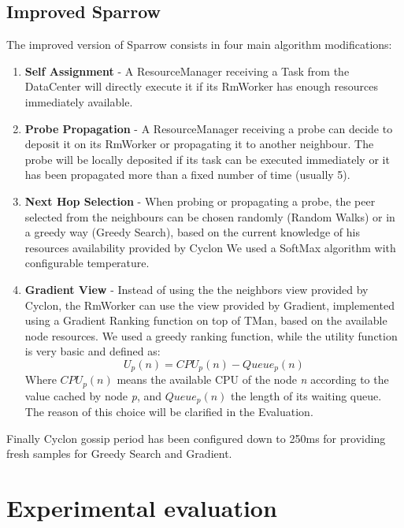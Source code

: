 \documentclass[conference]{IEEEtran}
\begin{document}
  \subsection{Improved Sparrow}
  The improved version of Sparrow consists in four main algorithm modifications:
   \begin{enumerate}

  \item \textbf{Self Assignment }- A ResourceManager receiving a Task from the DataCenter will directly execute it if its RmWorker has enough resources immediately available.
  
  \item \textbf{Probe Propagation} - A ResourceManager receiving a probe can decide to deposit it on its RmWorker or propagating it to another neighbour.  The probe will be locally deposited if its task can be executed immediately or it has been propagated more than a fixed number of time (usually 5).
  
   \item \textbf{Next Hop Selection} - When probing or propagating a probe, the peer selected from the neighbours can be chosen randomly (Random Walks) or in a greedy way (Greedy Search), based on the current knowledge of his resources availability provided by Cyclon We used a SoftMax algorithm with configurable temperature.
  
  \item \textbf{Gradient View} - Instead of using the the neighbors view provided by Cyclon, the RmWorker can use the view provided by Gradient, implemented using a Gradient Ranking function on top of TMan, based on the available node resources. We used a greedy ranking function, while the utility function is very basic and defined as:
\begin{equation}
 U_p(n) = CPU_p(n) - Queue_p(n)
\end{equation}
Where $CPU_p(n)$ means the available CPU of the node \textit{n} according to the value cached by node\textit{ p}, and $Queue_p(n)$ the length of its waiting queue.
   The reason of this choice will be clarified in the Evaluation.
  
  \end{enumerate}

Finally Cyclon gossip period has been configured down to 250ms for  providing fresh samples for Greedy Search and Gradient.

\section{Experimental evaluation}
\end{document}
